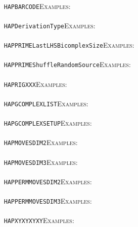 \documentclass[a4paper,11pt]{report}
\begin{document}
{{ \\
 \texttt{HAPBARCODE}{\nobreakspace}{\nobreakspace}{\nobreakspace}{\nobreakspace}\textsc{Examples:} \\
 \\
 \texttt{HAPDerivationType}{\nobreakspace}{\nobreakspace}{\nobreakspace}{\nobreakspace}\textsc{Examples:} \\
 \\
 \texttt{HAPPRIME{\textunderscore}LastLHSBicomplexSize}{\nobreakspace}{\nobreakspace}{\nobreakspace}{\nobreakspace}\textsc{Examples:} \\
 \\
 \texttt{HAPPRIME{\textunderscore}ShuffleRandomSource}{\nobreakspace}{\nobreakspace}{\nobreakspace}{\nobreakspace}\textsc{Examples:} \\
 \\
 \texttt{HAPRIGXXX}{\nobreakspace}{\nobreakspace}{\nobreakspace}{\nobreakspace}\textsc{Examples:} \\
 \\
 \texttt{HAP{\textunderscore}GCOMPLEX{\textunderscore}LIST}{\nobreakspace}{\nobreakspace}{\nobreakspace}{\nobreakspace}\textsc{Examples:} \\
 \\
 \texttt{HAP{\textunderscore}GCOMPLEX{\textunderscore}SETUP}{\nobreakspace}{\nobreakspace}{\nobreakspace}{\nobreakspace}\textsc{Examples:} \\
 \\
 \texttt{HAP{\textunderscore}MOVES{\textunderscore}DIM{\textunderscore}2}{\nobreakspace}{\nobreakspace}{\nobreakspace}{\nobreakspace}\textsc{Examples:} \\
 \\
 \texttt{HAP{\textunderscore}MOVES{\textunderscore}DIM{\textunderscore}3}{\nobreakspace}{\nobreakspace}{\nobreakspace}{\nobreakspace}\textsc{Examples:} \\
 \\
 \texttt{HAP{\textunderscore}PERMMOVES{\textunderscore}DIM{\textunderscore}2}{\nobreakspace}{\nobreakspace}{\nobreakspace}{\nobreakspace}\textsc{Examples:} \\
 \\
 \texttt{HAP{\textunderscore}PERMMOVES{\textunderscore}DIM{\textunderscore}3}{\nobreakspace}{\nobreakspace}{\nobreakspace}{\nobreakspace}\textsc{Examples:} \\
 \\
 \texttt{HAP{\textunderscore}XYXYXYXY}{\nobreakspace}{\nobreakspace}{\nobreakspace}{\nobreakspace}\textsc{Examples:} \\
}}
\end{document}
